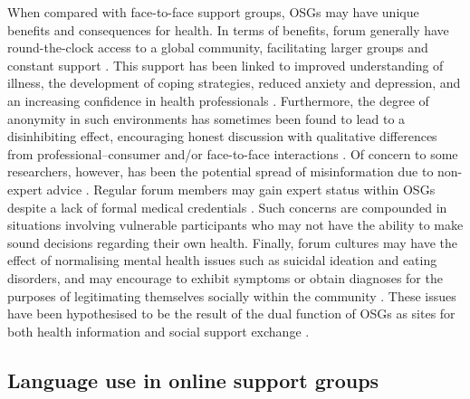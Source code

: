 



When compared with face\hyp{}to\hyp{}face support groups, \glspl{OSG} may have unique benefits and consequences for  health. In terms of benefits, \gls{forum}  generally have round\hyp{}the\hyp{}clock access to a global community, facilitating larger groups and constant support \cite{stommel_online_2010,stommel_use_2011}. This support has been linked to improved understanding of illness, the development of coping strategies, reduced anxiety and depression, and an increasing confidence in health professionals \cite{mulveen_interpretative_2006,swan_sharing_2010,manchaiah_use_2013,yao_impact_2015}. Furthermore, the degree of anonymity in such environments has sometimes been found to lead to a disinhibiting effect, encouraging honest discussion \cite{mo_are_2013} with qualitative differences from professional--consumer and\slash or face\hyp{}to\hyp{}face interactions \cite{maclean_forum77:_2015}. Of concern to some researchers, however, has been the potential spread of misinformation due to non\hyp{}expert advice \cite{ziebland_how_2004}. Regular \gls{forum} \glspl{member} may gain expert status within \glspl{OSG} despite a lack of formal medical credentials \cite{hardey_doctor_1999,thompson_credibility_2012}. Such concerns are compounded in situations involving vulnerable participants who may not have the ability to make sound decisions regarding their own health. Finally, \gls{forum} cultures may have the effect of normalising mental health issues such as suicidal ideation and eating disorders, and may encourage  to exhibit symptoms or obtain diagnoses for the purposes of legitimating themselves socially within the community \cite{horne_doing_2009,vayreda_social_2009}. These issues have been hypothesised to be the result of the dual function of \glspl{OSG} as sites for both health information and social support exchange \cite{nambisan_information_2011,attard_thematic_2012}.

\subsection{Language use in online support groups} \label{sect:intro-lang-in-osg}


